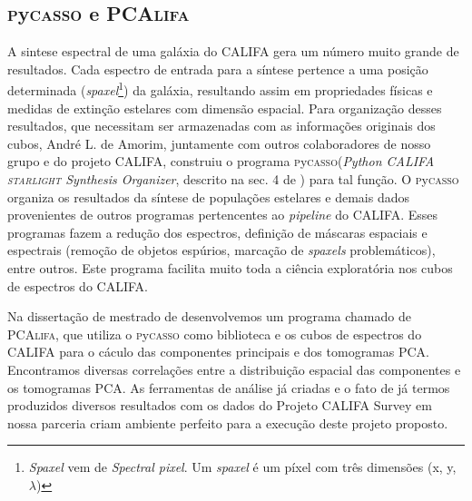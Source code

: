 \documentclass[a4paper,12pt]{article}
\newcommand\pycasso{\textsc{p}y\textsc{casso}\xspace}
\newcommand\pcalifa{PCA\textsc{lifa}\xspace}
\def\starlight{\textsc{starlight}\xspace}      %
\begin{document}
\subsection{\pycasso e \pcalifa}
\vspace{0.3cm}
A sintese espectral de uma galáxia do CALIFA gera um número muito grande de resultados. Cada
espectro de entrada para a síntese pertence a uma posição determinada ({\em spaxel}\footnote{{\em
Spaxel} vem de {\em Spectral pixel}. Um {\em spaxel} é um píxel com três dimensões (x, y,
$\lambda$)}) da galáxia, resultando assim em propriedades físicas e medidas de extinção estelares
com dimensão espacial. Para organização desses resultados, que necessitam ser armazenadas com as
informações originais dos cubos, André L. de Amorim, juntamente com outros colaboradores de nosso
grupo e do projeto CALIFA, construiu o programa \pycasso ({\em Python CALIFA \starlight Synthesis
Organizer}, descrito na sec. 4 de \citet{CidFernandes.etal.2013a}) para tal função. O \pycasso
organiza os resultados da síntese de populações estelares e demais dados provenientes de outros
programas pertencentes ao {\em pipeline} do CALIFA. Esses programas fazem a redução dos espectros,
definição de máscaras espaciais e espectrais (remoção de objetos espúrios, marcação de {\em spaxels}
problemáticos), entre outros. Este programa facilita muito toda a ciência exploratória nos cubos de
espectros do CALIFA.

Na dissertação de mestrado de \citet{Lacerda2014} desenvolvemos um programa chamado de \pcalifa, que
utiliza o \pycasso como biblioteca e os cubos de espectros do CALIFA para o cáculo das componentes
principais e dos tomogramas PCA. Encontramos diversas correlações entre a distribuição espacial das
componentes e os tomogramas PCA. As ferramentas de análise já criadas e o fato de já termos
produzidos diversos resultados com os dados do Projeto CALIFA Survey em nossa parceria criam
ambiente perfeito para a execução deste projeto proposto.
\end{document}

